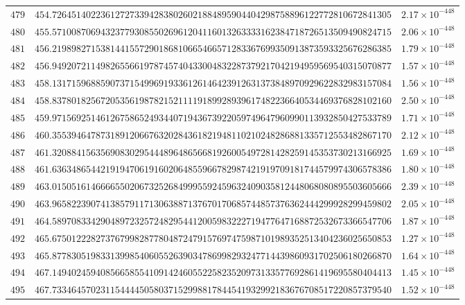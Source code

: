 \documentclass[12pt,reqno]{amsart}
\theoremstyle{remark}
\begin{document}
\begin{longtable}{clc}
$479$ & $454.7264514022361272733942838026021884895904404298758896122772810672841305$ & $2.17\times 10^{-448}$ \\
$480$ & $455.5710087069432377930855026961204116013263333162384718726513509490824715$ & $2.06\times 10^{-448}$ \\
$481$ & $456.2198982715381441557290186810665466571283367699350913873593325676286385$ & $1.79\times 10^{-448}$ \\
$482$ & $456.9492072114982655661978745740433004832287379217042194959569540315070877$ & $1.57\times 10^{-448}$ \\
$483$ & $458.1317159688590737154996919336126146423912631373848970929622832983157084$ & $1.56\times 10^{-448}$ \\
$484$ & $458.8378018256720535619878215211119189928939617482236640534469376828102160$ & $2.50\times 10^{-448}$ \\
$485$ & $459.9715692514612675865249344071943673922059749647960990113932850427533789$ & $1.71\times 10^{-448}$ \\
$486$ & $460.3553946478731891206676320284361821948110210248286881335712553482867170$ & $2.12\times 10^{-448}$ \\
$487$ & $461.3208841563569083029544489648656681926005497281428259145353730213166925$ & $1.69\times 10^{-448}$ \\
$488$ & $461.6363486544219194706191602064855966782987421919709181744579974306578386$ & $1.80\times 10^{-448}$ \\
$489$ & $463.0150516146666550206732526849995592459632409035812448068080895503605666$ & $2.39\times 10^{-448}$ \\
$490$ & $463.9658223907413857911713063887137670170685744857376362444299928299459802$ & $2.05\times 10^{-448}$ \\
$491$ & $464.5897083342904897232572482954412005983222719477647168872532673366547706$ & $1.87\times 10^{-448}$ \\
$492$ & $465.6750122282737679982877804872479157697475987101989352513404236025650853$ & $1.27\times 10^{-448}$ \\
$493$ & $465.8778305198331399854060552639034786998293247714439860931702506180266870$ & $1.64\times 10^{-448}$ \\
$494$ & $467.1494024594085665855410914246055225823520973133577692861419695580404413$ & $1.45\times 10^{-448}$ \\
$495$ & $467.7334645702311544445058037152998817844541932992183676708517220857379540$ & $1.52\times 10^{-448}$ \\

\end{longtable}
\end{document}
